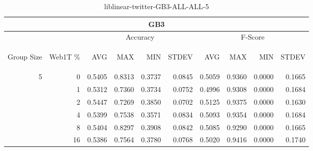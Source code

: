 \begin{center}
\begin{table}[htbp] 
 \begin{center}
\begin{tabular}{ | r | r | r | r | r | r | r | r | r | r |}
\hline
\multicolumn{10}{|c|}{GB3}\\
\hline
 & & \multicolumn{4}{|c|}{Accuracy} & \multicolumn{4}{|c|}{F-Score}\\ \cline{3-10}
\begin{sideways}Group Size\end{sideways} & \begin{sideways}Web1T \%\end{sideways} & \begin{sideways}AVG\end{sideways} & \begin{sideways}MAX\end{sideways} & \begin{sideways}MIN\end{sideways} & \begin{sideways}STDEV\end{sideways} & \begin{sideways}AVG\end{sideways} & \begin{sideways}MAX\end{sideways} & \begin{sideways}MIN\end{sideways} & \begin{sideways}STDEV\end{sideways}\\
\hline
\multirow{5}{*}{5}
 & 0 & 0.5405 & 0.8313 & 0.3737 & 0.0845 & 0.5059 & 0.9360 & 0.0000 & 0.1665\\ \cline{2-10}
 & 1 & 0.5312 & 0.7360 & 0.3734 & 0.0752 & 0.4996 & 0.9308 & 0.0000 & 0.1684\\ \cline{2-10}
 & 2 & 0.5447 & 0.7269 & 0.3850 & 0.0702 & 0.5125 & 0.9375 & 0.0000 & 0.1630\\ \cline{2-10}
 & 4 & 0.5399 & 0.7538 & 0.3571 & 0.0834 & 0.5093 & 0.9354 & 0.0000 & 0.1684\\ \cline{2-10}
 & 8 & 0.5404 & 0.8297 & 0.3908 & 0.0842 & 0.5085 & 0.9290 & 0.0000 & 0.1665\\ \cline{2-10}
 & 16 & 0.5386 & 0.7564 & 0.3780 & 0.0768 & 0.5020 & 0.9416 & 0.0000 & 0.1740\\ \cline{2-10}
\hline
\end{tabular}
\caption{liblinear-twitter-GB3-ALL-ALL-5}
\label{table:liblinear-twitter-GB3-ALL-ALL-5}
\end{center}
 \end{table}
\end{center}


